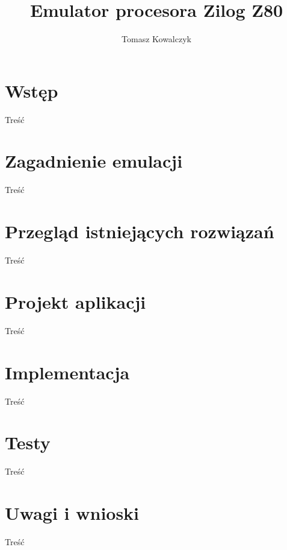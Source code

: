\documentclass{article}
\author{Tomasz Kowalczyk}
\title{Emulator procesora Zilog Z80}
\begin{document}
	\maketitle
	\tableofcontents
	
	\section{Wstęp}
	Treść
	
	
	\section{Zagadnienie emulacji}
	Treść
	
	\section{Przegląd istniejących rozwiązań}
	Treść
	
	\section{Projekt aplikacji}
	Treść
	
	\section{Implementacja}
	Treść
	
	\section{Testy}
	Treść
	
	\section{Uwagi i wnioski}
	Treść
	
\end{document}
